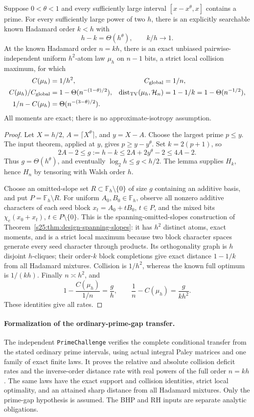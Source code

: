 \begin{theorem}
\label{s26:thm:stability-prime-transfer}
Suppose $0<\theta<1$ and every sufficiently large interval
$[x-x^\theta,x]$ contains a prime. For every sufficiently large power
of two $h$, there is an explicitly searchable known Hadamard order
$k<h$ with
\[
 h-k=\Theta(h^\theta),\qquad k/h\to1.
\]
At the known Hadamard order $n=kh$, there is an exact unbiased
pairwise-independent uniform $h^2$-atom law $\mu_h$ on $n-1$ bits,
a strict local collision maximum, for which
\begin{align*}
 C(\mu_h)&=1/h^2, & C_{\rm global}&=1/n,\\
 C(\mu_h)/C_{\rm global}&=1-\Theta(n^{-(1-\theta)/2}),&
 \operatorname{dist}_{\rm TV}(\mu_h,\mathcal H_n)
 &=1-1/k=1-\Theta(n^{-1/2}),\\
 1/n-C(\mu_h)&=\Theta(n^{-(3-\theta)/2}).
\end{align*}
All moments are exact; there is no approximate-isotropy assumption.
\end{theorem}
\begin{proof}
Let $X=h/2$, $A=\lceil X^\theta\rceil$, and $y=X-A$.
Choose the largest prime $p\le y$. The input theorem, applied at $y$,
gives $p\ge y-y^\theta$. Set $k=2(p+1)$, so
\[
 2A-2\le g:=h-k\le2A+2y^\theta-2\le4A-2.
\]
Thus $g=\Theta(h^\theta)$, and eventually
$\log_2h\le g<h/2$. The lemma supplies $H_k$, hence $H_n$ by tensoring
with Walsh order $h$.

Choose an omitted-slope set $R\subset\mathbb F_h\setminus\{0\}$ of
size $g$ containing an additive basis, and put
$P=\mathbb F_h\setminus R$. For uniform $A_0,B_0\in\mathbb F_h$, observe
all nonzero additive characters of each seed block
$x_t=A_0+tB_0$, $t\in P$, and the mixed bits $\chi_e(x_0+x_t)$,
$t\in P\setminus\{0\}$. This is the spanning-omitted-slopes construction
of Theorem~\ref{s25:thm:design-spanning-slopes}: it has $h^2$ distinct atoms,
exact moments, and is a strict local maximum because two block character
spaces generate every seed character through products. Its orthogonality
graph is $h$ disjoint $h$-cliques; their order-$k$ block completions give
exact distance $1-1/k$ from all Hadamard mixtures. Collision is $1/h^2$,
whereas the known full optimum is $1/(kh)$.
Finally $n\asymp h^2$, and
\[
 1-\frac{C(\mu_h)}{1/n}=\frac gh,\qquad
 \frac1n-C(\mu_h)=\frac{g}{kh^2}.
\]
These identities give all rates.
\end{proof}

\paragraph{Formalization of the ordinary-prime-gap transfer.}
The independent \texttt{PrimeChallenge} verifies the complete conditional
transfer from the stated ordinary prime intervals, using actual integral
Paley matrices and one family of exact finite laws. It proves the relative
and absolute collision deficit rates and the inverse-order distance rate
with real powers of the full order $n=kh$. The same laws have the exact
support and collision identities, strict local optimality, and an attained
sharp distance from all Hadamard mixtures. Only the prime-gap hypothesis
is assumed. The BHP and RH inputs are separate analytic obligations.

